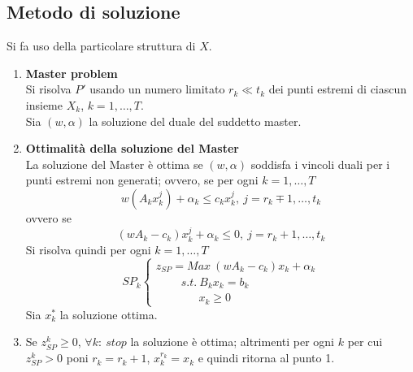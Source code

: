 \subsection{Metodo di soluzione}
Si fa uso della particolare struttura di $X$.
\begin{enumerate}
	\item \textbf{Master problem}\\
	Si risolva $P'$ usando un numero limitato $r_{k}\ll t_{k}$ dei punti estremi di ciascun insieme $X_{k}$, $k=1,\dots,T$.\\
	Sia $(w,\alpha)$ la soluzione del duale del suddetto master.
	\item \textbf{Ottimalità della soluzione del Master}\\
	La soluzione del Master è ottima se $(w,\alpha)$ soddisfa i vincoli duali per i punti estremi non generati; ovvero, se per ogni $k=1,\dots,T$
	\begin{equation}
		w(A_{k}x_{k}^{j})+\alpha_{k}\le c_{k}x_{k}^{j},\ j=r_{k}\mp 1,\dots,t_{k}
	\end{equation}
	ovvero se
	\begin{equation}
			(w A_{k}-c_{k})x_{k}^{j}+\alpha_{k}\le 0,\ j=r_{k}+1,\dots,t_{k}
	\end{equation}
	Si risolva quindi per ogni $k=1,\dots,T$
	\begin{equation*}
		SP_{k}
		\begin{cases}
			z_{SP}=Max\ (w A_{k}-c_{k})x_{k}+\alpha_{k} \\
			\ \ \ \ \ \ \ \ \ \ s.t.\ B_{k}x_{k}=b_{k} \\
			\ \ \ \ \ \ \ \ \ \ \ \ \ \ \ \ \ x_{k}\ge 0
		\end{cases}
	\end{equation*}
	Sia $x_{k}^{*}$ la soluzione ottima.
	\item Se $z_{SP}^{k}\ge 0$, $\forall k:\ stop$ la soluzione è ottima; altrimenti per ogni $k$ per cui $z_{SP}^{k}>0$ poni $r_{k}=r_{k}+1$, $x_{k}^{r_{k}}=x_{k}$ e quindi ritorna al punto 1.
\end{enumerate}

